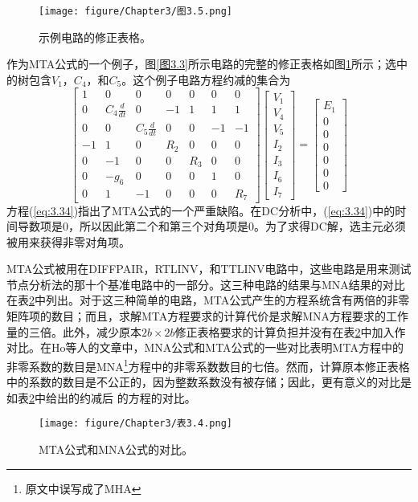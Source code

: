 \begin{figure}[htbp]
\small
    \centering
    \texttt{[image: figure/Chapter3/图3.5.png]}
    \caption{示例电路的修正表格。}
    \label{图3.5}
\end{figure}

作为MTA公式的一个例子，图\ref{图3.3}所示电路的完整的修正表格如图\ref{图3.5}所示；选中的树包含$V_1$，$C_4$，和$C_5$。这个例子电路方程约减的集合为
\begin{equation}
    \begin{bmatrix}
    1 & 0 & 0 & 0 & 0 & 0 & 0 \\
    0 & C_4\frac{d}{dt} & 0 & -1 & 1 & 1 & 1 \\
    0 & 0 & C_5\frac{d}{dt} & 0 & 0 & -1 & -1 \\
    -1 & 1 & 0 & R_2 & 0 & 0 & 0 \\
    0 & -1 & 0 & 0 & R_3 & 0 & 0 \\
    0 & -g_6 & 0 & 0 & 0 & 1 & 0 \\
    0 & 1 & -1 & 0 & 0 & 0 & R_7
    \end{bmatrix}\begin{bmatrix}
    V_1 \\
    V_4 \\
    V_5 \\
    I_2 \\
    I_3 \\
    I_6 \\
    I_7
    \end{bmatrix}=\begin{bmatrix}
    E_1 \\
    0 \\
    0 \\
    0 \\
    0 \\
    0 \\
    0
    \end{bmatrix}
    \label{eq:3.34}
\end{equation}
方程(\ref{eq:3.34})指出了MTA公式的一个严重缺陷。在DC分析中，(\ref{eq:3.34})中的时间导数项是0，所以因此第二个和第三个对角项是0。为了求得DC解，选主元必须被用来获得非零对角项。

MTA公式被用在DIFFPAIR，RTLINV，和TTLINV电路中，这些电路是用来测试节点分析法的那十个基准电路中的一部分。这三种电路的结果与MNA结果的对比在表\ref{表3.4}中列出。对于这三种简单的电路，MTA公式产生的方程系统含有两倍的非零矩阵项的数目；而且，求解MTA方程要求的计算代价是求解MNA方程要求的工作量的三倍。此外，减少原本$2b \times 2b$修正表格要求的计算负担并没有在表\ref{表3.4}中加入作对比。在Ho等人\cite{ref-47}的文章中，MNA公式和MTA公式的一些对比表明MTA方程中的非零系数的数目是MNA\footnote{原文中误写成了MHA}方程中的非零系数数目的七倍。然而，计算原本修正表格中的系数的数目是不公正的，因为整数系数没有被存储\cite{ref-29}；因此，更有意义的对比是如表\ref{表3.4}中给出的约减后 的方程的对比。
\begin{figure}[htbp]
\small
    \centering
    \texttt{[image: figure/Chapter3/表3.4.png]}
    \caption{MTA公式和MNA公式的对比。}
    \label{表3.4}
\end{figure}

